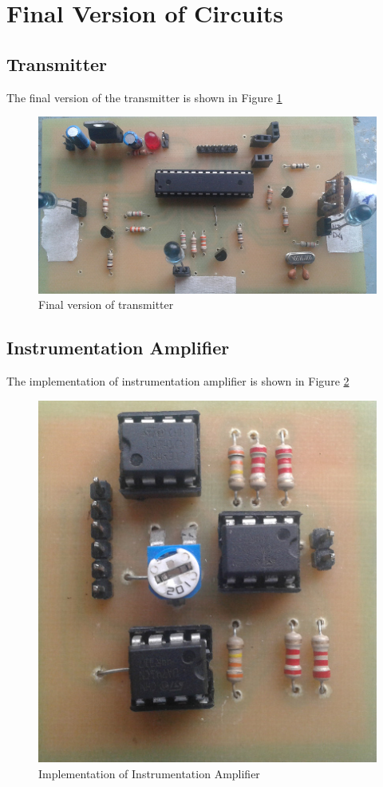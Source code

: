 \section{Final Version of Circuits}

\subsection{Transmitter}
The final version of the transmitter is shown in Figure \ref{fig:TransmitterModule}
\begin{figure}[htpb]
	\centering
	\includegraphics[scale=0.6]{Images/TransmitterModule.jpg}
	\caption{Final version of transmitter}
	\label{fig:TransmitterModule}
\end{figure}

\subsection{Instrumentation Amplifier}
The implementation of instrumentation amplifier is shown in Figure \ref{fig:ImplementationofAmplifier}
\begin{figure}[htpb]
	\centering
	\includegraphics[scale=0.25]{Images/InstrumentationAmplifier.jpg}
	\caption{Implementation of Instrumentation Amplifier}
	\label{fig:ImplementationofAmplifier}
\end{figure}

